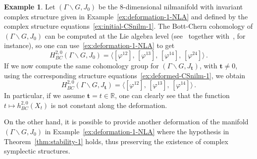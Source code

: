 \documentclass[a4paper]{amsart}
\theoremstyle{definition}
\newtheorem{example}[theorem]{Example}
\theoremstyle{remark}
\numberwithin{equation}{section}
\begin{document}

\begin{example}\label{ex:deformation1-BC-non-preserved}
Let $(\Gamma\backslash G,J_0)$ be the $8$-dimensional nilmanifold with invariant complex structure given in Example~\ref{ex:deformation-1-NLA} and defined by the complex structure equations~\eqref{ex:initial-CSnilm-1}. The Bott-Chern cohomology of $(\Gamma\backslash G,J_0)$ can be computed at the Lie algebra level (see~\cite{angella} together with~\cite{rollenske-tomassini-wang}, for instance), so one can use~\eqref{ex:deformation-1-NLA} to get
\[
H_{BC}^{2,0}(\Gamma\backslash G,J_0)=\langle [\varphi^{12}],\,[\varphi^{13}],\,[\varphi^{14}],\,[\varphi^{24}] \rangle\,.
\]
If we now compute the same cohomology group for $(\Gamma\backslash G, J_{\mathbf t})$, with $\mathbf t\neq 0$, using the corresponding structure equations~\eqref{ex:deformed-CSnilm-1}, we obtain
\[
H_{BC}^{2,0}(\Gamma\backslash G,J_{\mathbf t})=\langle [\varphi^{12}],\,[\varphi^{13}],\,[\varphi^{14}]\rangle\,.
\]
In particular, if we assume $\mathbf t=t\in\mathbb R$, one can clearly see that the function $t\mapsto h^{2,0}_{BC}(X_t)$ is not constant along the deformation.
\end{example}

On the other hand, it is possible to provide another deformation of the manifold $(\Gamma\backslash G,J_0)$ in Example~\ref{ex:deformation-1-NLA} where the hypothesis in Theorem~\ref{thm:stability-1} holds, thus preserving the existence of complex symplectic structures.
\end{document}
